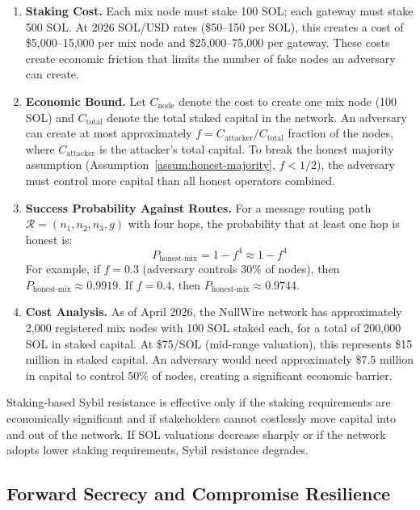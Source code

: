 \documentclass[11pt]{article}
\theoremstyle{definition}
\theoremstyle{remark}
\begin{document}
\begin{enumerate}
    \item \textbf{Staking Cost.} Each mix node must stake 100 SOL; each gateway must stake 500 SOL. At 2026 SOL/USD rates (\$50--150 per SOL), this creates a cost of \$5,000--15,000 per mix node and \$25,000--75,000 per gateway. These costs create economic friction that limits the number of fake nodes an adversary can create.

    \item \textbf{Economic Bound.} Let $C_{\text{node}}$ denote the cost to create one mix node (100 SOL) and $C_{\text{total}}$ denote the total staked capital in the network. An adversary can create at most approximately $f = C_{\text{attacker}} / C_{\text{total}}$ fraction of the nodes, where $C_{\text{attacker}}$ is the attacker's total capital. To break the honest majority assumption (Assumption~\ref{assum:honest-majority}, $f < 1/2$), the adversary must control more capital than all honest operators combined.

    \item \textbf{Success Probability Against Routes.} For a message routing path $\mathcal{R} = (n_1, n_2, n_3, g)$ with four hops, the probability that at least one hop is honest is:
    \begin{equation}
    P_{\text{honest-mix}} = 1 - f^4 \approx 1 - f^4
    \label{eq:sybil-math}
    \end{equation}
    For example, if $f = 0.3$ (adversary controls 30\% of nodes), then $P_{\text{honest-mix}} \approx 0.9919$. If $f = 0.4$, then $P_{\text{honest-mix}} \approx 0.9744$.

    \item \textbf{Cost Analysis.} As of April 2026, the NullWire network has approximately 2,000 registered mix nodes with 100 SOL staked each, for a total of 200,000 SOL in staked capital. At \$75/SOL (mid-range valuation), this represents \$15 million in staked capital. An adversary would need approximately \$7.5 million in capital to control 50\% of nodes, creating a significant economic barrier.
\end{enumerate}

Staking-based Sybil resistance is effective only if the staking requirements are economically significant and if stakeholders cannot costlessly move capital into and out of the network. If SOL valuations decrease sharply or if the network adopts lower staking requirements, Sybil resistance degrades.

\subsection{Forward Secrecy and Compromise Resilience}
\label{subsec:fwd-sec}
\end{document}
